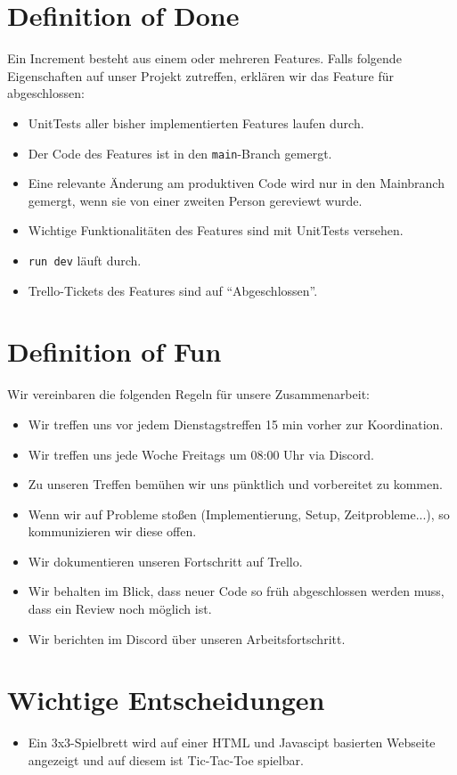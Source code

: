 \documentclass[titlepage]{scrartcl}
\begin{document}
\section{Definition of Done}%
Ein Increment besteht aus einem oder mehreren Features.
Falls folgende Eigenschaften auf unser Projekt zutreffen, erklären wir das Feature für abgeschlossen:
\begin{itemize}
	\item UnitTests aller bisher implementierten Features laufen durch.
	\item Der Code des Features ist in den \texttt{main}-Branch gemergt.
	\item Eine relevante Änderung am produktiven Code wird nur in den Mainbranch gemergt, wenn sie von einer zweiten Person gereviewt wurde.
	\item Wichtige Funktionalitäten des Features sind mit UnitTests versehen.
	\item \texttt{run dev} läuft durch.
	\item Trello-Tickets des Features sind auf "`Abgeschlossen"'.
\end{itemize}

\section{Definition of Fun}%
Wir vereinbaren die folgenden Regeln für unsere Zusammenarbeit:
\begin{itemize}
	\item Wir treffen uns vor jedem Dienstagstreffen 15 min vorher zur Koordination.
	\item Wir treffen uns jede Woche Freitags um 08:00 Uhr via Discord.
	\item Zu unseren Treffen bemühen wir uns pünktlich und vorbereitet zu kommen.
	\item Wenn wir auf Probleme stoßen (Implementierung, Setup, Zeitprobleme...), so kommunizieren wir diese offen.
	\item Wir dokumentieren unseren Fortschritt auf Trello.
	\item Wir behalten im Blick, dass neuer Code so früh abgeschlossen werden muss, dass ein Review noch möglich ist.
	\item Wir berichten im Discord über unseren Arbeitsfortschritt.
\end{itemize}

\section{Wichtige Entscheidungen}
\begin{itemize}
\item Ein 3x3-Spielbrett wird auf einer HTML und Javascipt basierten Webseite angezeigt und auf diesem ist Tic-Tac-Toe spielbar.
\end{itemize}
\end{document}
